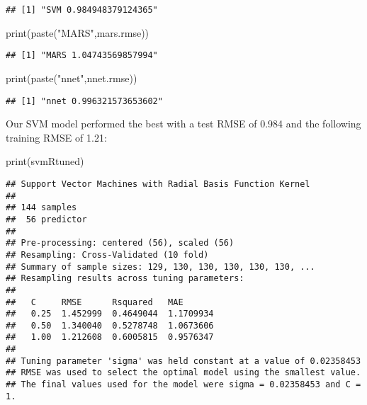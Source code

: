\documentclass[
]{article}
\newenvironment{Shaded}{\begin{snugshade}}{\end{snugshade}}
\newcommand{\FunctionTok}[1]{\textcolor[rgb]{0.00,0.00,0.00}{#1}}
\newcommand{\NormalTok}[1]{#1}
\newcommand{\StringTok}[1]{\textcolor[rgb]{0.31,0.60,0.02}{#1}}
\begin{document}
\begin{verbatim}
## [1] "SVM 0.984948379124365"
\end{verbatim}

\begin{Shaded}
\begin{Highlighting}[]
\FunctionTok{print}\NormalTok{(}\FunctionTok{paste}\NormalTok{(}\StringTok{"MARS"}\NormalTok{,mars.rmse))}
\end{Highlighting}
\end{Shaded}

\begin{verbatim}
## [1] "MARS 1.04743569857994"
\end{verbatim}

\begin{Shaded}
\begin{Highlighting}[]
\FunctionTok{print}\NormalTok{(}\FunctionTok{paste}\NormalTok{(}\StringTok{"nnet"}\NormalTok{,nnet.rmse))}
\end{Highlighting}
\end{Shaded}

\begin{verbatim}
## [1] "nnet 0.996321573653602"
\end{verbatim}

Our SVM model performed the best with a test RMSE of 0.984 and the
following training RMSE of 1.21:

\begin{Shaded}
\begin{Highlighting}[]
\FunctionTok{print}\NormalTok{(svmRtuned)}
\end{Highlighting}
\end{Shaded}

\begin{verbatim}
## Support Vector Machines with Radial Basis Function Kernel 
## 
## 144 samples
##  56 predictor
## 
## Pre-processing: centered (56), scaled (56) 
## Resampling: Cross-Validated (10 fold) 
## Summary of sample sizes: 129, 130, 130, 130, 130, 130, ... 
## Resampling results across tuning parameters:
## 
##   C     RMSE      Rsquared   MAE      
##   0.25  1.452999  0.4649044  1.1709934
##   0.50  1.340040  0.5278748  1.0673606
##   1.00  1.212608  0.6005815  0.9576347
## 
## Tuning parameter 'sigma' was held constant at a value of 0.02358453
## RMSE was used to select the optimal model using the smallest value.
## The final values used for the model were sigma = 0.02358453 and C = 1.
\end{verbatim}
\end{document}
